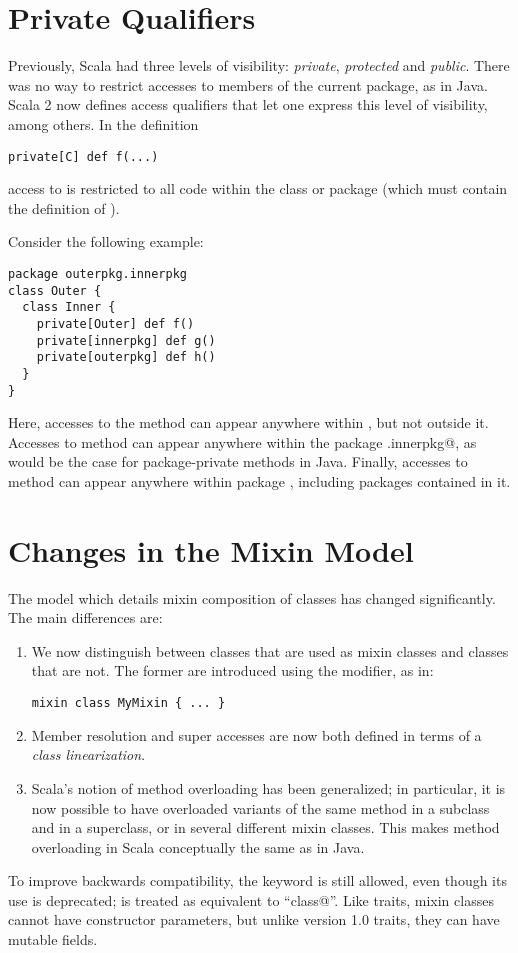 \documentclass[a4paper,11pt,twoside]{article}
\begin{document}
\section{Private Qualifiers}

Previously, Scala had three levels of visibility: {\em private},
{\em protected} and {\em public}. There was no way to
restrict accesses to members of the current package, as in Java. Scala
2 now defines access qualifiers that let one express this level of
visibility, among others. In the definition
\begin{lstlisting}
private[C] def f(...)
\end{lstlisting}
access to \lstinline@f@ is restricted to all code within the class or
package \lstinline@C@ (which must contain the definition of \lstinline@f@).

Consider the following example:
\begin{lstlisting}
package outerpkg.innerpkg
class Outer {
  class Inner {
    private[Outer] def f()
    private[innerpkg] def g()
    private[outerpkg] def h()
  }
}
\end{lstlisting}
Here, accesses to the method \lstinline@f@ can appear anywhere within
\lstinline@OuterClass@, but not outside it. Accesses to method
\lstinline@g@ can appear anywhere within the package
\lstinline@outerpkg.innerpkg@, as would be the case for
package-private methods in Java. Finally, accesses to method
\lstinline@h@ can appear anywhere within package \lstinline@outerpkg@,
including packages contained in it. 

\section{Changes in the Mixin Model}\label{sec:mixin-classes}

The model which details mixin composition of classes has changed
significantly. The main differences are:
\begin{enumerate}
\item
We now distinguish between classes that are used as mixin classes and
classes that are not. The former are introduced using the
\lstinline@mixin@ modifier, as in:
\begin{lstlisting}
mixin class MyMixin { ... }
\end{lstlisting}
\item
Member resolution and super accesses are now both defined in terms of
a {\em class linearization}. 
\item
Scala's notion of method overloading has been generalized; in
 particular, it is now possible to have overloaded variants of the
 same method in a subclass and in a superclass, or in several different
 mixin classes. This makes method overloading in Scala conceptually the
 same as in Java.
\end{enumerate}
To improve backwards compatibility, the \lstinline@trait@ keyword is
still allowed, even though its use is deprecated; \lstinline@trait@
is treated as equivalent to ``\lstinline@mixin class@''. Like traits,
mixin classes cannot have constructor parameters, but unlike version
1.0 traits, they can have mutable fields.
\end{document}
